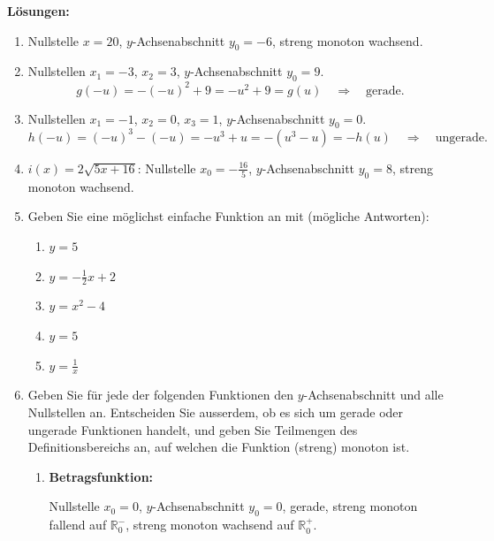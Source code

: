 \clearpage
\textbf{Lösungen:}
\begin{enumerate}
    \item Nullstelle \(x=20\), \(y\)-Achsenabschnitt \(y_0=-6\),
          streng monoton wachsend.

    \item Nullstellen \(x_1=-3\), \(x_2=3\),
          \(y\)-Achsenabschnitt \(y_0=9\).
          \[
              g(-u)
              =-(-u)^2+9
              =-u^2+9
              =g(u)
              \quad\Rightarrow\quad \text{gerade}.
          \]

    \item Nullstellen \(x_1=-1\), \(x_2=0\), \(x_3=1\),
          \(y\)-Achsenabschnitt \(y_0=0\).
          \[
              h(-u)
              =(-u)^3-(-u)
              =-u^3+u
              =-(u^3-u)
              =-h(u)
              \quad\Rightarrow\quad \text{ungerade}.
          \]

    \item \(i(x)=2\sqrt{5x+16}\):
          Nullstelle \(x_0=-\frac{16}{5}\),
          \(y\)-Achsenabschnitt \(y_0=8\),
          streng monoton wachsend.

    \item Geben Sie eine möglichst einfache Funktion an mit
          (mögliche Antworten):
          \begin{enumerate}
              \item \(y=5\)
              \item \(y=-\frac12 x+2\)
              \item \(y=x^2-4\)
              \item \(y=5\)
              \item \(y=\frac1x\)
          \end{enumerate}

    \item Geben Sie für jede der folgenden Funktionen den
          \(y\)-Achsenabschnitt und alle Nullstellen an.
          Entscheiden Sie ausserdem, ob es sich um gerade oder
          ungerade Funktionen handelt, und geben Sie Teilmengen
          des Definitionsbereichs an, auf welchen die Funktion
          (streng) monoton ist.

          \begin{enumerate}
              \item \textbf{Betragsfunktion:}

                    Nullstelle \(x_0=0\), \(y\)-Achsenabschnitt \(y_0=0\),
                    gerade, streng monoton fallend auf
                    \(\mathbb R_0^-\), streng monoton wachsend auf
                    \(\mathbb R_0^+\).


\end{enumerate}
\end{enumerate}
